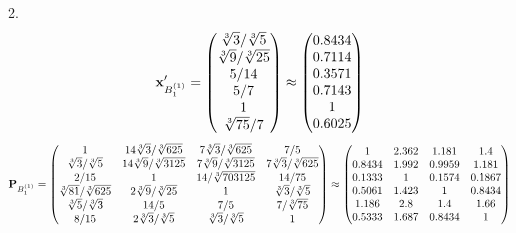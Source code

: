 \documentclass[10pt,a4paper]{article}
\begin{document}
	2.
	\[
		\bold{x}'_{B_1^{(1)}} = 
		\begin{pmatrix}
			{\sqrt[3]{3}} / {\sqrt[3]{5}} \\
			{\sqrt[3]{9}} / {\sqrt[3]{25}} \\
			{{5}} / {{14}} \\
			{{5}} / {{7}} \\
			{1}{} \\
			{\sqrt[3]{75}} / {{7}} \\
		\end{pmatrix}
		\approx
		\begin{pmatrix}
			0.8434   \\
			0.7114   \\
			0.3571   \\
			0.7143   \\
			1        \\
			0.6025   \\
		\end{pmatrix}
	\]
	\[
		\bold{P}_{B_1^{(1)}} = 
		\begin{pmatrix}
			{1}{} & {{14}\sqrt[3]{3}} / {\sqrt[3]{625}} & {{7}\sqrt[3]{3}} / {\sqrt[3]{625}} & {{7}} / {{5}} \\
			{\sqrt[3]{3}} / {\sqrt[3]{5}} & {{14}\sqrt[3]{9}} / {\sqrt[3]{3125}} & {{7}\sqrt[3]{9}} / {\sqrt[3]{3125}} & {{7}\sqrt[3]{3}} / {\sqrt[3]{625}} \\
			{{2}} / {{15}} & {1}{} & {{14}} / {\sqrt[3]{703125}} & {{14}} / {{75}} \\
			{\sqrt[3]{81}} / {\sqrt[3]{625}} & {{2}\sqrt[3]{9}} / {\sqrt[3]{25}} & {1}{} & {\sqrt[3]{3}} / {\sqrt[3]{5}} \\
			{\sqrt[3]{5}} / {\sqrt[3]{3}} & {{14}} / {{5}} & {{7}} / {{5}} & {{7}} / {\sqrt[3]{75}} \\
			{{8}} / {{15}} & {{2}\sqrt[3]{3}} / {\sqrt[3]{5}} & {\sqrt[3]{3}} / {\sqrt[3]{5}} & {1}{} \\
		\end{pmatrix}
		\approx
		\begin{pmatrix}
			1        & 2.362    & 1.181    & 1.4      \\
			0.8434   & 1.992    & 0.9959   & 1.181    \\
			0.1333   & 1        & 0.1574   & 0.1867   \\
			0.5061   & 1.423    & 1        & 0.8434   \\
			1.186    & 2.8      & 1.4      & 1.66     \\
			0.5333   & 1.687    & 0.8434   & 1        \\
		\end{pmatrix}
	\]
\end{document}
